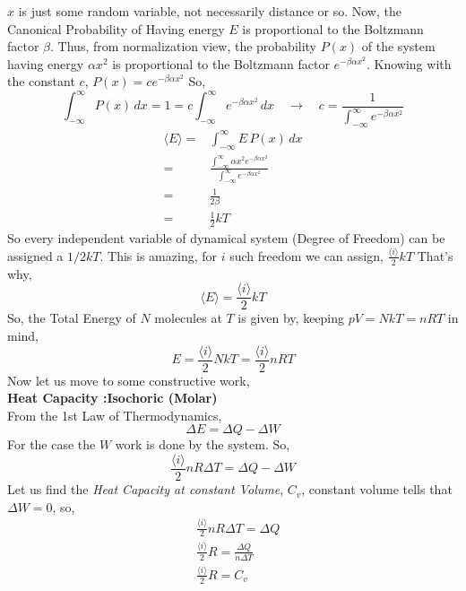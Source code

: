 \documentclass[a4paper]{article}
\theoremstyle{definition}
\begin{document}
$x$ is just some random variable, not necessarily distance or so. Now, the Canonical Probability of Having energy $E$ is proportional to the Boltzmann factor $\beta$. Thus, from normalization view, the probability $P(x)$ of the system having energy $\alpha x^2$ is proportional to the Boltzmann factor $e^{-\beta \alpha x^2}$. Knowing with the constant $c$, $P(x) = c e^{-\beta \alpha x^2 }$ So,
\[ \int_{-\infty}^{\infty} P(x) \, dx = 1 = c \int_{-\infty}^{\infty} e^{-\beta \alpha x^2 } \, dx \quad \rightarrow \quad c = \frac{1}{\int_{-\infty}^{\infty} e^{-\beta \alpha x^2 }}\]
\begin{align*}
\langle E \rangle =& \int_{-\infty}^{\infty} E \, P(x) \,dx \\
=& \frac{\int_{-\infty}^{\infty} \alpha x^2 e^{-\beta \alpha x^2 }}
{\int_{-\infty}^{\infty} e^{-\beta \alpha x^2 }} \\
=& \frac{1}{2 \beta} \\
=& \frac{1}{2}kT 
\end{align*}
So every independent variable of dynamical system (Degree of Freedom) can be assigned a $1/2 kT$. This is amazing, for $i$ such freedom we can assign, $\frac{\langle i \rangle}{2} kT $ 
That's why, 
\begin{equation}
\langle E \rangle = \frac{\langle i \rangle}{2} kT 
\end{equation}
So, the Total Energy of $N$ molecules at $T$ is given by, keeping $pV = NkT = nRT$ in mind, 
\begin{equation}
E =  \frac{\langle i \rangle}{2} NkT =  \frac{\langle i \rangle}{2} nRT 
\end{equation}
Now let us move to some constructive work, \\
\textbf{Heat Capacity :Isochoric (Molar)} \\
From the 1st Law of Thermodynamics, 
\begin{equation}
\Delta E = \Delta Q - \Delta W 
\end{equation}
For the case the $W$ work is done by the system. So, 
\[  \frac{\langle i \rangle}{2}nR \Delta T = \Delta Q - \Delta W \]
Let us find the \emph{Heat Capacity at constant Volume}, $C_v$, constant volume tells that $\Delta W = 0$, so, 
\begin{align*}
&\frac{\langle i \rangle}{2}nR \Delta T = \Delta Q \\
& \frac{\langle i \rangle}{2}R = \frac{\Delta Q}{n \Delta T} \\
& \frac{\langle i \rangle}{2}R = C_v
\end{align*}
\end{document}

